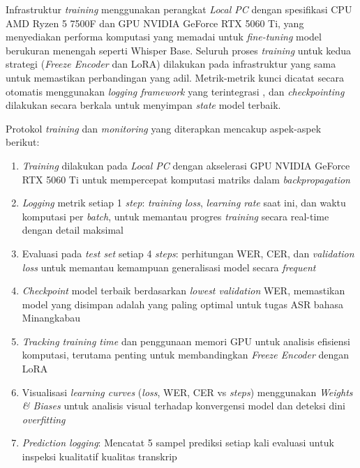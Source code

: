 Infrastruktur \textit{training} menggunakan perangkat \textit{Local PC} dengan spesifikasi CPU AMD Ryzen 5 7500F dan GPU NVIDIA GeForce RTX 5060 Ti, yang menyediakan performa komputasi yang memadai untuk \textit{fine-tuning} model berukuran menengah seperti Whisper Base. Seluruh proses \textit{training} untuk kedua strategi (\textit{Freeze Encoder} dan LoRA) dilakukan pada infrastruktur yang sama untuk memastikan perbandingan yang adil. Metrik-metrik kunci dicatat secara otomatis menggunakan \textit{logging framework} yang terintegrasi \cite{wolf2020transformers}, dan \textit{checkpointing} dilakukan secara berkala untuk menyimpan \textit{state} model terbaik.

Protokol \textit{training} dan \textit{monitoring} yang diterapkan mencakup aspek-aspek berikut:

\begin{enumerate}[noitemsep]
    \item \textit{Training} dilakukan pada \textit{Local PC} dengan akselerasi GPU NVIDIA GeForce RTX 5060 Ti untuk mempercepat komputasi matriks dalam \textit{backpropagation} \cite{nvidia2023cuda,paszke2019pytorch}
    \item \textit{Logging} metrik setiap 1 \textit{step}: \textit{training loss}, \textit{learning rate} saat ini, dan waktu komputasi per \textit{batch}, untuk memantau progres \textit{training} secara real-time dengan detail maksimal
    \item Evaluasi pada \textit{test set} setiap 4 \textit{steps}: perhitungan WER, CER, dan \textit{validation loss} untuk memantau kemampuan generalisasi model secara \textit{frequent}
    \item \textit{Checkpoint} model terbaik berdasarkan \textit{lowest validation} WER, memastikan model yang disimpan adalah yang paling optimal untuk tugas ASR bahasa Minangkabau
    \item \textit{Tracking training time} dan penggunaan memori GPU untuk analisis efisiensi komputasi, terutama penting untuk membandingkan \textit{Freeze Encoder} dengan LoRA
    \item Visualisasi \textit{learning curves} (\textit{loss}, WER, CER vs \textit{steps}) menggunakan \textit{Weights \& Biases} \cite{biewald2020wandb} untuk analisis visual terhadap konvergensi model dan deteksi dini \textit{overfitting}
    \item \textit{Prediction logging}: Mencatat 5 sampel prediksi setiap kali evaluasi untuk inspeksi kualitatif kualitas transkrip
\end{enumerate}

